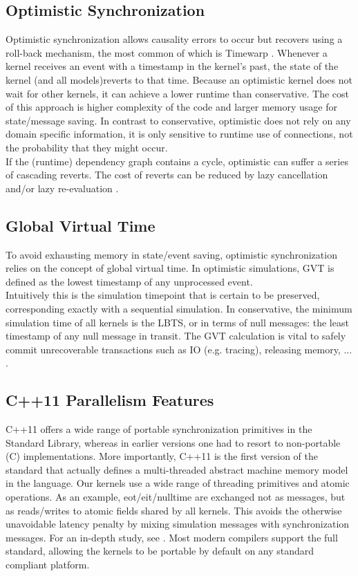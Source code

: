 \subsection{Optimistic Synchronization}
Optimistic synchronization allows causality errors to occur but recovers using a roll-back mechanism, the most common of which is Timewarp \cite{Jefferson:1985:VT:3916.3988}.
Whenever a kernel receives an event with a timestamp in the kernel's past, the state of the kernel (and all models)reverts to that time.
Because an optimistic kernel does not wait for other kernels, it can achieve a lower runtime than conservative.
The cost of this approach is higher complexity of the code and larger memory usage for state/message saving.
In contrast to conservative, optimistic does not rely on any domain specific information, it is only sensitive to runtime use of connections, not the probability that they might occur. %
\\
If the (runtime) dependency graph contains a cycle, optimistic can suffer a series of cascading reverts. The cost of reverts can be reduced by lazy cancellation and/or lazy re-evaluation \cite{FujimotoBook}.
\subsection{Global Virtual Time}
To avoid exhausting memory in state/event saving, optimistic synchronization relies on the concept of global virtual time\cite{Jefferson:1985:VT:3916.3988}. In optimistic simulations, GVT is defined as the lowest timestamp of any unprocessed event. \\ Intuitively this is the simulation timepoint that is certain to be preserved, corresponding exactly with a sequential simulation.
In conservative, the minimum simulation time of all kernels is the LBTS, or in terms of null messages: the least timestamp of any null message in transit.
The GVT calculation is vital to safely commit unrecoverable transactions such as IO (e.g. tracing), releasing memory, ... .

\subsection{C++11 Parallelism Features}
C++11 offers a wide range of portable synchronization primitives in the Standard Library, whereas in earlier versions one had to resort to non-portable (C) implementations. More importantly, C++11 is the first version of the standard that actually defines a multi-threaded abstract machine memory model in the language.
Our kernels use a wide range of threading primitives and atomic operations. As an example, eot/eit/nulltime are exchanged not as messages, but as reads/writes to atomic fields shared by all kernels. This avoids the otherwise unavoidable latency penalty by mixing simulation messages with synchronization messages. For an in-depth study, see \cite{CPE:CPE3007}.
Most modern compilers support the full standard, allowing the kernels to be portable by default on any standard compliant platform. 
